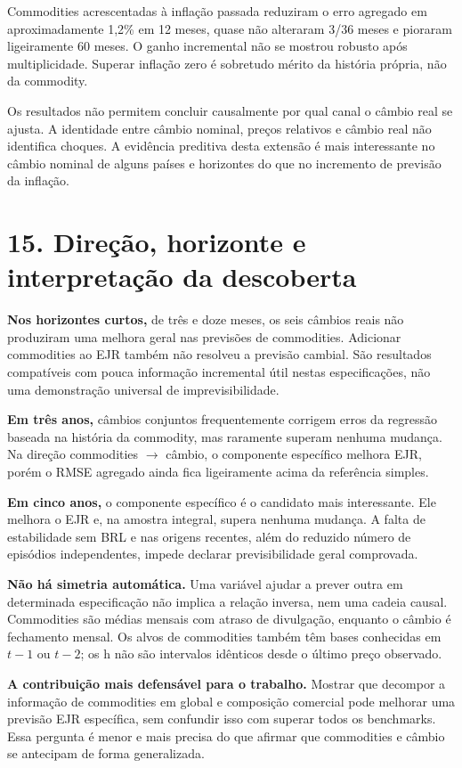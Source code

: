 \documentclass[11pt,a4paper]{article}
\begin{document}
Commodities acrescentadas à inflação passada reduziram o erro agregado em aproximadamente 1,2\% em 12 meses, quase não alteraram 3/36 meses e pioraram ligeiramente 60 meses. O ganho incremental não se mostrou robusto após multiplicidade. Superar inflação zero é sobretudo mérito da história própria, não da commodity.

Os resultados não permitem concluir causalmente por qual canal o câmbio real se ajusta. A identidade entre câmbio nominal, preços relativos e câmbio real não identifica choques. A evidência preditiva desta extensão é mais interessante no câmbio nominal de alguns países e horizontes do que no incremento de previsão da inflação.

\clearpage

\section*{15. Direção, horizonte e interpretação da descoberta}
\textbf{Nos horizontes curtos,} de três e doze meses, os seis câmbios reais não produziram uma melhora geral nas previsões de commodities. Adicionar commodities ao EJR também não resolveu a previsão cambial. São resultados compatíveis com pouca informação incremental útil nestas especificações, não uma demonstração universal de imprevisibilidade.

\textbf{Em três anos,} câmbios conjuntos frequentemente corrigem erros da regressão baseada na história da commodity, mas raramente superam nenhuma mudança. Na direção commodities $\rightarrow$ câmbio, o componente específico melhora EJR, porém o RMSE agregado ainda fica ligeiramente acima da referência simples.

\textbf{Em cinco anos,} o componente específico é o candidato mais interessante. Ele melhora o EJR e, na amostra integral, supera nenhuma mudança. A falta de estabilidade sem BRL e nas origens recentes, além do reduzido número de episódios independentes, impede declarar previsibilidade geral comprovada.

\textbf{Não há simetria automática.} Uma variável ajudar a prever outra em determinada especificação não implica a relação inversa, nem uma cadeia causal. Commodities são médias mensais com atraso de divulgação, enquanto o câmbio é fechamento mensal. Os alvos de commodities também têm bases conhecidas em $t-1$ ou $t-2$; os h não são intervalos idênticos desde o último preço observado.

\textbf{A contribuição mais defensável para o trabalho.} Mostrar que decompor a informação de commodities em global e composição comercial pode melhorar uma previsão EJR específica, sem confundir isso com superar todos os benchmarks. Essa pergunta é menor e mais precisa do que afirmar que commodities e câmbio se antecipam de forma generalizada.
\end{document}
